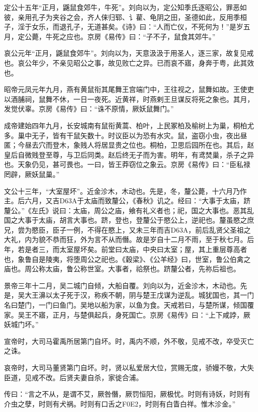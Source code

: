 \documentclass[]{article}
\begin{document}
定公十五年``正月，鼷鼠食郊牛，牛死''。刘向以为，定公知季氏逐昭公，罪恶如彼，亲用孔子为夹谷之会，齐人俫归郓、讠雚、龟阴之田，圣德如此，反用季桓子，淫于女乐，而退孔子，无道甚矣。《诗》曰：``人而亡仪，不死何为！''是岁五月，定公薨，牛死之应也。京房《易传》曰：``子不子，鼠食其郊牛。''

哀公元年``正月，鼷鼠食郊牛''。刘向以为，天意汲汲于用圣人，逐三家，故复见戒也。哀公年少，不亲见昭公之事，故见败亡之异。已而哀不寤，身奔于粤，此其效也。

昭帝元凤元年九月，燕有黄鼠衔其尾舞王宫端门中，王往视之，鼠舞如故。王使吏以酒脯祠，鼠舞不休，一日一夜死。近黄祥，时燕剌王旦谋反将死之象也。其月，发觉伏辜。京房《易传》曰：``诛不原情，厥妖鼠舞门。''

成帝建始四年九月，长安城南有鼠衔黄蒿、柏叶，上民冢柏及榆树上为巢，桐柏尤多。巢中无子，皆有干鼠矢数十。时议臣以为恐有水灾。鼠，盗窃小虫，夜出昼匿；今昼去穴而登木，象贱人将居显贵之位也。桐柏，卫思后园所在也。其后，赵皇后自微贱登至尊，与卫后同类。赵后终无子而为害。明年，有鸢焚巢，杀子之异也。天象仍见，甚可畏也。一曰，皆王莽窃位之象云。京房《易传》曰：``臣私禄罔辟，厥妖鼠巢。''

文公十三年，``大室屋坏''。近金沴木，木动也。先是，冬，釐公薨，十六月乃作主。后六月，又吉D63A于太庙而致釐公，《春秋》讥之。经曰：``大事于太庙，跻釐公。''《左氏》说曰：太庙，周公之庙，飨有礼义者也；祀，国之大事也。恶其乱国之大事于太庙，胡言大事也。跻，登也，登釐公于愍公上，逆祀也。釐虽愍之庶兄，尝为愍臣，臣子一例，不得在愍上，又未三年而吉D63A，前后乱贤父圣祖之大礼，内为貌不恭而狂，外为言不从而僭。故是岁自十二月不雨，至于秋七月。后年，若是者三，而太室屋坏矣。前堂曰太庙，中央曰太室；屋，其上重层尊高者也，象鲁自是陵夷，将堕周公之祀也。《穀梁》、《公羊经》曰，世室，鲁公伯禽之庙也。周公称太庙，鲁公称世室。大事者，祫祭也。跻釐公者，先祢后祖也。

景帝三年十二月，吴二城门自倾，大船自覆。刘向以为，近金沴木，木动也。先是，吴大王濞以太子死于汉，称疾不朝，阴与楚王戊谋为逆乱。城犹国也，其一门名曰楚门，一门曰鱼门。吴地以船为家，以鱼为食。天戒若曰，与楚所谋，倾国覆家。吴王不寤，正月，与楚俱起兵，身死国亡。京房《易传》曰：``上下咸誖，厥妖城门坏。''

宣帝时，大司马霍禹所居第门自坏。时，禹内不顺，外不敬，见戒不改，卒受灭亡之诛。

哀帝时，大司马董贤第门自坏。时，贤以私爱居大位，赏赐无度，骄嫚不敬，大失臣道，见戒不改。后贤夫妻自杀，家徙合浦。

传曰：``言之不从，是谓不艾，厥咎僭，厥罚恒阳，厥极忧。时则有诗妖，时则有介虫之孽，时则有犬祸。时则有口舌之F0E2，时则有白眚白祥。惟木沴金。''
\end{document}
